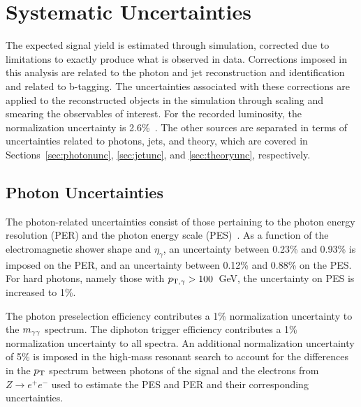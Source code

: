 \chapter{Systematic Uncertainties\label{ch:uncertainties}}

The expected signal yield is estimated through simulation, corrected
due to limitations to exactly produce what is observed in data.
Corrections imposed in this analysis are related to the photon and jet reconstruction and identification
and related to b-tagging.
The uncertainties associated with these corrections are applied to the reconstructed objects in
the simulation through scaling and smearing the observables of interest.
For the recorded luminosity, the normalization uncertainty is 2.6\%~\cite{CMS-PAS-LUM-13-001}.
The other sources are separated in terms of uncertainties related to photons, jets, and theory,
which are covered in Sections~\ref{sec:photonunc}, \ref{sec:jetunc}, and \ref{sec:theoryunc},
respectively.

\section{Photon Uncertainties\label{sec:photonunc}}

The photon-related uncertainties consist of those pertaining to the photon energy resolution (PER)
and the photon energy scale (PES)~\cite{CMS-PAS-HIG-13-001}. As a function of the
electromagnetic shower shape and $\eta_\gamma$,
an uncertainty between 0.23\% and 0.93\% is imposed on the PER,
and an uncertainty between 0.12\% and 0.88\% on the PES. For hard photons, namely those with
$p_{{\rm T},\gamma} > 100$~GeV, the uncertainty on PES is increased to 1\%.

The photon preselection efficiency contributes a 1\% normalization uncertainty to the $m_{\gamma\gamma}$
spectrum. The diphoton trigger efficiency contributes a 1\% normalization
uncertainty to all spectra.
An additional normalization uncertainty of 5\% is imposed in the high-mass resonant search
to account for the differences in the $p_{\rm T}$ spectrum between photons of the signal
and the electrons from $Z\rightarrow e^+ e^-$ used to estimate the PES and PER and their
corresponding uncertainties.

